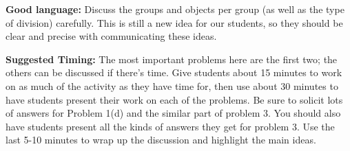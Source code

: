 \documentclass[nooutcomes,noauthor,handout]{ximera}
\begin{document}
\begin{instructorNotes}
{\bf Good language:} Discuss the groups and objects per group (as well as the type of division) carefully. This is still a new idea for our students, so they should be clear and precise with communicating these ideas.

{\bf Suggested Timing:} The most important problems here are the first two; the others can be discussed if there's time. Give students about 15 minutes to work on as much of the activity as they have time for, then use about 30 minutes to have students present their work on each of the problems. Be sure to solicit lots of answers for Problem 1(d) and the similar part of problem 3. You should also have students present all the kinds of answers they get for problem 3. Use the last 5-10 minutes to wrap up the discussion and highlight the main ideas.
\end{instructorNotes}
\end{document}

